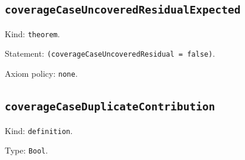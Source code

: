 \documentclass[11pt]{article}
\begin{document}
\subsection*{\texttt{coverageCaseUncoveredResidualExpected}}
\noindent Kind: \texttt{theorem}.\par
\noindent Statement: \texttt{(coverageCaseUncoveredResidual = false)}.\par
\noindent Axiom policy: \texttt{none}.\par
\subsection*{\texttt{coverageCaseDuplicateContribution}}
\noindent Kind: \texttt{definition}.\par
\noindent Type: \texttt{Bool}.\par
\end{document}
